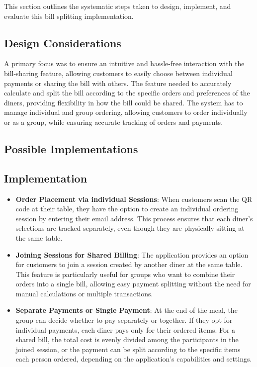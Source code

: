 This section outlines the systematic steps taken to design, implement, and evaluate this bill splitting implementation.

\subsection{Design Considerations}
A primary focus was to ensure an intuitive and hassle-free interaction with the bill-sharing feature, allowing customers to easily choose between individual payments or sharing the bill with others. The feature needed to accurately calculate and split the bill according to the specific orders and preferences of the diners, providing flexibility in how the bill could be shared. The system has to manage individual and group ordering, allowing customers to order individually or as a group, while ensuring accurate tracking of orders and payments.

\subsection*{Possible Implementations}


\subsection{Implementation}
\begin{itemize}
    \item \textbf{Order Placement via individual Sessions}: When customers scan the QR code at their table, they have the option to create an individual ordering session by entering their email address. This process ensures that each diner's selections are tracked separately, even though they are physically sitting at the same table.
    \item \textbf{Joining Sessions for Shared Billing}: The application provides an option for customers to join a session created by another diner at the same table. This feature is particularly useful for groups who want to combine their orders into a single bill, allowing easy payment splitting without the need for manual calculations or multiple transactions.
    \item \textbf{Separate Payments or Single Payment}: At the end of the meal, the group can decide whether to pay separately or together. If they opt for individual payments, each diner pays only for their ordered items. For a shared bill, the total cost is evenly divided among the participants in the joined session, or the payment can be split according to the specific items each person ordered, depending on the application's capabilities and settings.
\end{itemize}

